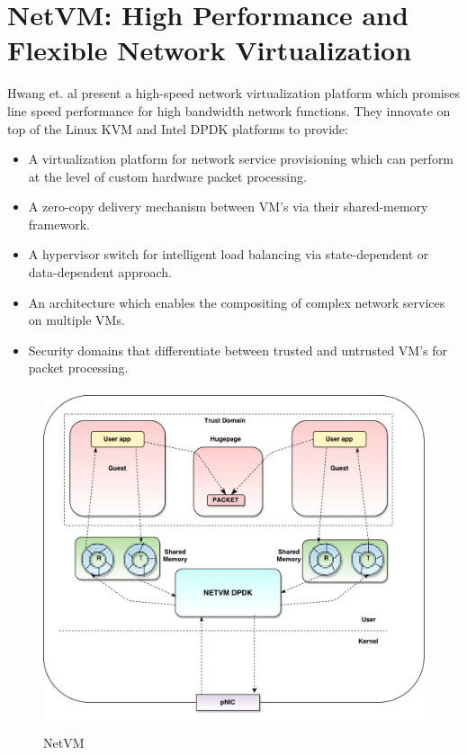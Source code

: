 \section{NetVM: High Performance and Flexible Network Virtualization}
Hwang et. al \cite{hwang2015netvm} present a high-speed network virtualization platform which promises line speed performance for high bandwidth network functions. They innovate on top of the Linux KVM and Intel DPDK platforms to provide:
\begin{itemize}
 \item A virtualization platform for network service provisioning which can perform at the level of custom hardware packet processing.
 \item A zero-copy delivery mechanism between VM's via their shared-memory framework.
 \item A hypervisor switch for intelligent load balancing via state-dependent or data-dependent approach.
 \item An architecture which enables the compositing of complex network services on multiple VMs.
 \item Security domains that differentiate between trusted and untrusted VM's for packet processing.
\end{itemize}

 \begin{figure}[H]
 \centering
 \caption{NetVM} 
 \includegraphics[height=10cm]{netvm01.pdf} 
\end{figure}

